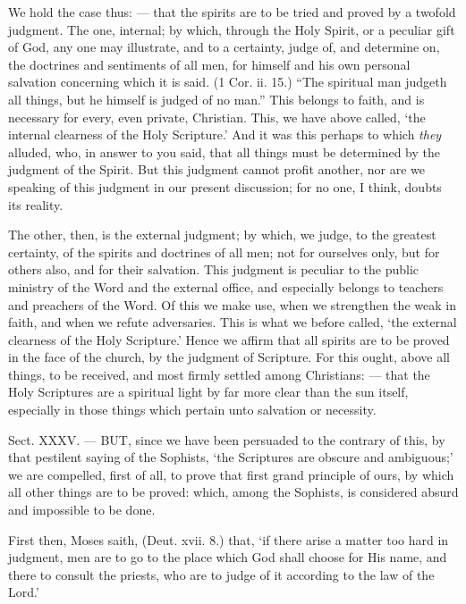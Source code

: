 We hold the case thus: — that the spirits are to be tried and proved by a twofold judgment. The one, internal; by which, through the Holy Spirit, or a peculiar gift of God, any one may illustrate, and to a certainty, judge of, and determine on, the doctrines and sentiments of all men, for himself and his own personal salvation concerning which it is said. (1 Cor. ii. 15.) “The spiritual man judgeth all things, but he himself is judged of no man.” This belongs to faith, and is necessary for every, even private, Christian. This, we have above called, ‘the internal clearness of the Holy Scripture.’ And it was this perhaps to which \emph{they }alluded, who, in answer to you said, that all things must be determined by the judgment of the Spirit. But this judgment cannot profit another, nor are we speaking of this judgment in our present discussion; for no one, I think, doubts its reality.

The other, then, is the external judgment; by which, we judge, to the greatest certainty, of the spirits and doctrines of all men; not for ourselves only, but for others also, and for their salvation. This judgment is peculiar to the public ministry of the Word and the external office, and especially belongs to teachers and preachers of the Word. Of this we make use, when we strengthen the weak in faith, and when we refute adversaries. This is what we before called, ‘the external clearness of the Holy Scripture.’ Hence we affirm that all spirits are to be proved in the face of the church, by the judgment of Scripture. For this ought, above all things, to be received, and most firmly settled among Christians: — that the Holy Scriptures are a spiritual light by far more clear than the sun itself, especially in those things which pertain unto salvation or necessity.


Sect. XXXV. — BUT, since we have been persuaded to the contrary of this, by that pestilent saying of the Sophists, ‘the Scriptures are obscure and ambiguous;’ we are compelled, first of all, to prove that first grand principle of ours, by which all other things are to be proved: which, among the Sophists, is considered absurd and impossible to be done.

First then, Moses saith, (Deut. xvii. 8.) that, ‘if there arise a matter too hard in judgment, men are to go to the place which God shall choose for His name, and there to consult the priests, who are to judge of it according to the law of the Lord.’

